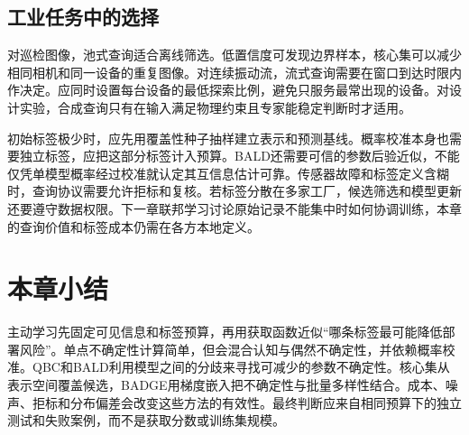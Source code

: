 \subsection{工业任务中的选择}

对巡检图像，池式查询适合离线筛选。低置信度可发现边界样本，核心集可以减少相同相机和同一设备的重复图像。对连续振动流，流式查询需要在窗口到达时限内作决定。应同时设置每台设备的最低探索比例，避免只服务最常出现的设备。对设计实验，合成查询只有在输入满足物理约束且专家能稳定判断时才适用。

初始标签极少时，应先用覆盖性种子抽样建立表示和预测基线。概率校准本身也需要独立标签，应把这部分标签计入预算。BALD还需要可信的参数后验近似，不能仅凭单模型概率经过校准就认定其互信息估计可靠。传感器故障和标签定义含糊时，查询协议需要允许拒标和复核。若标签分散在多家工厂，候选筛选和模型更新还要遵守数据权限。下一章联邦学习讨论原始记录不能集中时如何协调训练，本章的查询价值和标签成本仍需在各方本地定义。

\section{本章小结}

主动学习先固定可见信息和标签预算，再用获取函数近似“哪条标签最可能降低部署风险”。单点不确定性计算简单，但会混合认知与偶然不确定性，并依赖概率校准。QBC和BALD利用模型之间的分歧来寻找可减少的参数不确定性。核心集从表示空间覆盖候选，BADGE用梯度嵌入把不确定性与批量多样性结合。成本、噪声、拒标和分布偏差会改变这些方法的有效性。最终判断应来自相同预算下的独立测试和失败案例，而不是获取分数或训练集规模。
